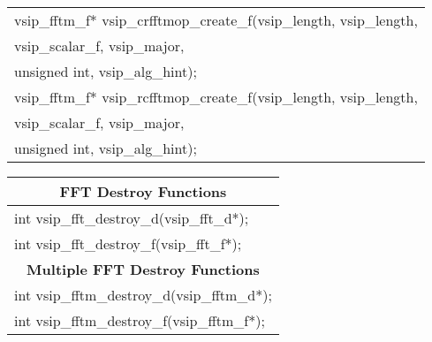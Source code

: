 {\begin{tabular}[H]{|l|}
vsip\_fftm\_f* vsip\_crfftmop\_create\_f(vsip\_length, vsip\_length,\\*\hspace{.7cm}vsip\_scalar\_f, vsip\_major,\\*\hspace{.7cm} unsigned int, vsip\_alg\_hint);\\
vsip\_fftm\_f* vsip\_rcfftmop\_create\_f(vsip\_length, vsip\_length,\\*\hspace{.7cm}vsip\_scalar\_f, vsip\_major,\\*\hspace{.7cm} unsigned int, vsip\_alg\_hint);\\ \hline
\end{tabular}
}
\clearpage
\hspace*{1.cm} {
\ttfamily
\begin{tabular}[H]{|l|}
\multicolumn{1}{c}{\rmfamily \bfseries FFT Destroy Functions}\\ \hline
int vsip\_fft\_destroy\_d(vsip\_fft\_d*);\\
int vsip\_fft\_destroy\_f(vsip\_fft\_f*);\\
\multicolumn{1}{c}{\rmfamily \bfseries Multiple FFT Destroy Functions}\\ \hline
int vsip\_fftm\_destroy\_d(vsip\_fftm\_d*);\\
int vsip\_fftm\_destroy\_f(vsip\_fftm\_f*);\\ \hline
\end{tabular}
}\vspace{.1cm}
